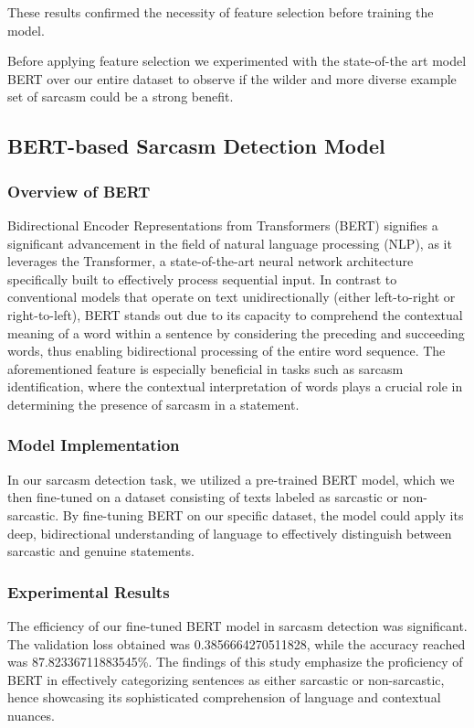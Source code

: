 \documentclass[10pt,twocolumn,letterpaper]{article}
\begin{document}
These results confirmed the necessity of feature selection before training the model.

Before applying feature selection we experimented with the state-of-the art model BERT over our entire dataset to observe if the wilder and more diverse example set of sarcasm could be a strong benefit.
\subsection{BERT-based Sarcasm Detection Model}
\subsubsection{Overview of BERT}
Bidirectional Encoder Representations from Transformers (BERT) signifies a significant advancement in the field of natural language processing (NLP), as it leverages the Transformer, a state-of-the-art neural network architecture specifically built to effectively process sequential input.
In contrast to conventional models that operate on text unidirectionally (either left-to-right or right-to-left), BERT stands out due to its capacity to comprehend the contextual meaning of a word within a sentence by considering the preceding and succeeding words, thus enabling bidirectional processing of the entire word sequence.
The aforementioned feature is especially beneficial in tasks such as sarcasm identification, where the contextual interpretation of words plays a crucial role in determining the presence of sarcasm in a statement.

\subsubsection{Model Implementation}
In our sarcasm detection task, we utilized a pre-trained BERT model, which we then fine-tuned on a dataset consisting of texts labeled as sarcastic or non-sarcastic. 
By fine-tuning BERT on our specific dataset, the model could apply its deep, bidirectional understanding of language to effectively distinguish between sarcastic and genuine statements.

\subsubsection{Experimental Results}
The efficiency of our fine-tuned BERT model in sarcasm detection was significant. 
The validation loss obtained was 0.3856664270511828, while the accuracy reached was 87.82336711883545\%. 
The findings of this study emphasize the proficiency of BERT in effectively categorizing sentences as either sarcastic or non-sarcastic, hence showcasing its sophisticated comprehension of language and contextual nuances.
\end{document}
